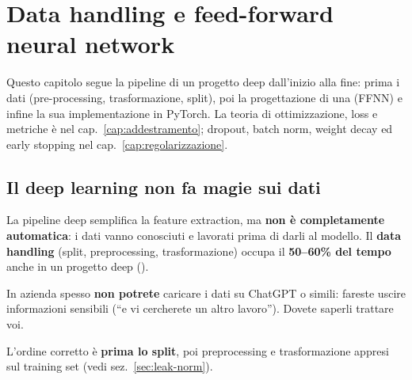 \chapter{Data handling e feed-forward neural network}
\label{cap:ffnn}

Questo capitolo segue la pipeline di un progetto deep dall'inizio alla fine: prima i dati (pre-processing, trasformazione,
split), poi la progettazione di una  (FFNN) e infine la sua implementazione in PyTorch.
La teoria di ottimizzazione, loss e metriche è nel cap.~\ref{cap:addestramento}; dropout, batch norm, weight decay ed early
stopping nel cap.~\ref{cap:regolarizzazione}.

\section{Il deep learning non fa magie sui dati}
\label{sec:ffnn-pipeline}
La pipeline deep semplifica la feature extraction, ma \textbf{non è completamente automatica}: i dati vanno conosciuti e
lavorati prima di darli al modello. Il \textbf{data handling} (split, preprocessing, trasformazione) occupa il
\textbf{50--60\% del tempo} anche in un progetto deep ().

\begin{attenzione}
In azienda spesso \textbf{non potrete} caricare i dati su ChatGPT o simili: fareste uscire informazioni sensibili
(``e vi cercherete un altro lavoro''). Dovete saperli trattare voi.
\end{attenzione}

\begin{center}
\end{center}
L'ordine corretto è \textbf{prima lo split}, poi preprocessing e trasformazione appresi sul training set (vedi
sez.~\ref{sec:leak-norm}).

